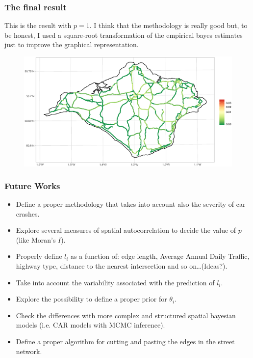 \documentclass[c,10pt,pdftex]{beamer}
\begin{document}
\begin{frame}
\vspace{-0.25cm}
\frametitle{The final result}
This is the result with $p = 1$. I think that the methodology is really good but, to be honest, I used a square-root transformation of the empirical bayes estimates just to improve the graphical representation. 
\begin{figure}
	\centering
	\includegraphics[width=\linewidth]{images/empirical_bayes_2}
\end{figure}
\end{frame}


\begin{frame}[t,allowframebreaks]
\frametitle{Future Works}
\begin{itemize}
	\setlength\itemsep{1em}
	\item Define a proper methodology that takes into account also the severity of car crashes.
	\item Explore several measures of spatial autocorrelation to decide the value of $p$ (like Moran's $I$). 
	\item Properly define $l_i$ as a function of: edge length, Average Annual Daily Traffic, highway type, distance to the nearest intersection and so on\dots (Ideas?).
	\item Take into account the variability associated with the prediction of $l_i$.
	\item Explore the possibility to define a proper prior for $\theta_{i}$. 
	\item Check the differences with more complex and structured spatial bayesian models (i.e. CAR models with MCMC inference).
	 \item Define a proper algorithm for cutting and pasting the edges in the street network. 
\end{itemize}
\end{frame}
\end{document}
